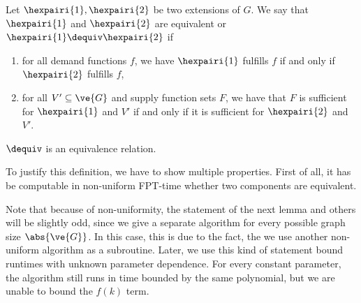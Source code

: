 
\begin{definition}[Equivalence]\label{def:dequiv}
  Let $\hexpairi{1}, \hexpairi{2}$ be two extensions of $G$. We say that $\hexpairi{1}$ and $\hexpairi{2}$ are equivalent or $\hexpairi{1} \dequiv \hexpairi{2}$ if \begin{enumerate}
    \item for all demand functions $f$, we have $\hexpairi{1}$ fulfills $f$ if and only if $\hexpairi{2}$ fulfills $f$,
    \item for all $V' \subseteq \ve{G}$ and supply function sets $F$, we have that $F$ is sufficient for $\hexpairi{1}$ and $V'$ if and only if it is sufficient for $\hexpairi{2}$ and $V'$.\qedhere
  \end{enumerate}
\end{definition}
\begin{observation}
  $\dequiv$ is an equivalence relation.
\end{observation}

To justify this definition, we have to show multiple properties. First of all, it has be computable in non-uniform FPT-time whether two components are equivalent.

Note that because of non-uniformity, the statement of the next lemma and others will be slightly odd, since we give a separate algorithm for every possible graph size $\abs{\ve{G}}$. In this case, this is due to the fact, the we use another non-uniform algorithm as a subroutine. Later, we use this kind of statement bound runtimes with unknown parameter dependence. For every constant parameter, the algorithm still runs in time bounded by the same polynomial, but we are unable to bound the $f(k)$ term.

